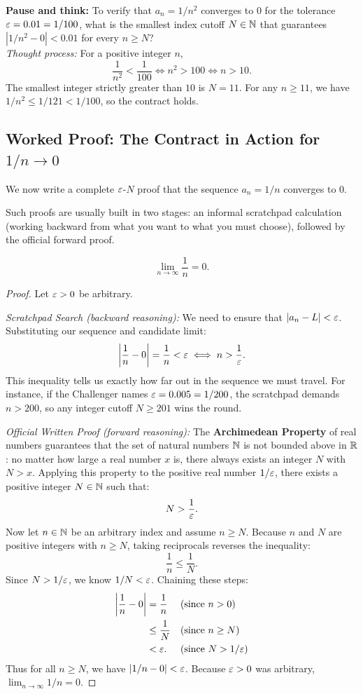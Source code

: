 \begin{recoverybox}
\textbf{Pause and think:} To verify that $a_n = 1/n^2$ converges to $0$ for the tolerance $\varepsilon = 0.01 = 1/100$, what is the smallest index cutoff $N \in \mathbb{N}$ that guarantees $|1/n^2 - 0| < 0.01$ for every $n \ge N$?
\\[0.4em]
\emph{Thought process:} For a positive integer $n$,
\[
\frac{1}{n^2} < \frac{1}{100} \iff n^2 > 100 \iff n > 10.
\]
The smallest integer strictly greater than $10$ is $N = 11$. For any $n \ge 11$, we have $1/n^2 \le 1/121 < 1/100$, so the contract holds.
\end{recoverybox}

\subsection{Worked Proof: The Contract in Action for \texorpdfstring{$1/n \to 0$}{1/n -> 0}}

We now write a complete $\varepsilon$-$N$ proof that the sequence $a_n = 1/n$ converges to $0$.

Such proofs are usually built in two stages: an informal scratchpad calculation (working backward from what you want to what you must choose), followed by the official forward proof.

\begin{theorem}
\[
\lim_{n \to \infty} \frac{1}{n} = 0.
\]
\end{theorem}

\begin{proof}
Let $\varepsilon > 0$ be arbitrary. 

\emph{Scratchpad Search (backward reasoning):} We need to ensure that $|a_n - L| < \varepsilon$. Substituting our sequence and candidate limit:
\[
\left|\frac{1}{n} - 0\right| = \frac{1}{n} < \varepsilon \iff n > \frac{1}{\varepsilon}.
\]
This inequality tells us exactly how far out in the sequence we must travel. For instance, if the Challenger names $\varepsilon = 0.005 = 1/200$, the scratchpad demands $n > 200$, so any integer cutoff $N \ge 201$ wins the round.

\emph{Official Written Proof (forward reasoning):}
The \textbf{Archimedean Property} of real numbers guarantees that the set of natural numbers $\mathbb{N}$ is not bounded above in $\mathbb{R}$: no matter how large a real number $x$ is, there always exists an integer $N$ with $N > x$. Applying this property to the positive real number $1/\varepsilon$, there exists a positive integer $N \in \mathbb{N}$ such that:
\[
N > \frac{1}{\varepsilon}.
\]
Now let $n \in \mathbb{N}$ be an arbitrary index and assume $n \ge N$.
Because $n$ and $N$ are positive integers with $n \ge N$, taking reciprocals reverses the inequality:
\[
\frac{1}{n} \le \frac{1}{N}.
\]
Since $N > 1/\varepsilon$, we know $1/N < \varepsilon$. Chaining these steps:
\begin{align*}
\left|\frac{1}{n} - 0\right| &= \frac{1}{n} && \text{(since $n > 0$)}\\
&\le \frac{1}{N} && \text{(since $n \ge N$)}\\
&< \varepsilon. && \text{(since $N > 1/\varepsilon$)}
\end{align*}
Thus for all $n \ge N$, we have $|1/n - 0| < \varepsilon$. Because $\varepsilon > 0$ was arbitrary, $\lim_{n \to \infty} 1/n = 0$.
\end{proof}

